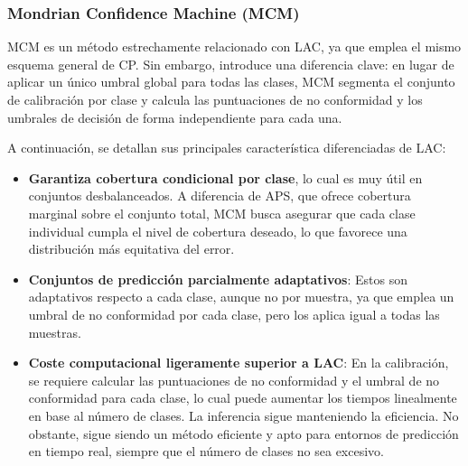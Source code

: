 

\subsubsection{Mondrian Confidence Machine (MCM)}

\acrshort{MCM} \cite{vovk2003} es un método estrechamente relacionado con \acrshort{LAC}, ya que emplea el mismo esquema general de \acrshort{CP}. Sin embargo, introduce una diferencia clave: en lugar de aplicar un único umbral global para todas las clases, \acrshort{MCM} segmenta el conjunto de calibración por clase y calcula las puntuaciones de no conformidad y los umbrales de decisión de forma independiente para cada una.

A continuación, se detallan sus principales característica diferenciadas de \acrshort{LAC}:

\begin{itemize}

    \item \textbf{Garantiza cobertura condicional por clase}, lo cual es muy útil en conjuntos desbalanceados. A diferencia de \acrshort{APS}, que ofrece cobertura marginal sobre el conjunto total, MCM busca asegurar que cada clase individual cumpla el nivel de cobertura deseado, lo que favorece una distribución más equitativa del error.
    
    \item \textbf{Conjuntos de predicción parcialmente adaptativos}: Estos son adaptativos respecto a cada clase, aunque no por muestra, ya que emplea un umbral de no conformidad por cada clase, pero los aplica igual a todas las muestras.  

    \item \textbf{Coste computacional ligeramente superior a \acrshort{LAC}}: En la calibración, se requiere calcular las puntuaciones de no conformidad y el umbral de no conformidad para cada clase, lo cual puede aumentar los tiempos linealmente en base al número de clases. La inferencia sigue manteniendo la eficiencia. No obstante, sigue siendo un método eficiente y apto para entornos de predicción en tiempo real, siempre que el número de clases no sea excesivo.

\end{itemize}

